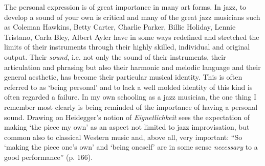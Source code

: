 \documentclass[a4paper]{article}
\begin{document}
The personal expression is of great importance in many art forms. In jazz, to develop a sound of your own is critical and many of the great jazz musicians such as Coleman Hawkins, Betty Carter, Charlie Parker, Billie Holiday, Lennie Tristano, Carla Bley, Albert Ayler have in some ways redefined and stretched the limits of their instruments through their highly skilled, individual and original output. Their \emph{sound}, i.e. not only the sound of their instruments, their articulation and phrasing but also their harmonic and melodic language and their general aesthetic, has become their particular musical identity. This is often referred to as `being personal' and to lack a well molded identity of this kind is often regarded a failure. In my own schooling as a jazz musician, the one thing I remember most clearly is being reminded of the importance of having a personal sound. Drawing on Heidegger's notion of \emph{Eignetlichkeit} \citet{benson03} sees the expectation of making `the piece my own' as an aspect not limited to jazz improvisation, but common also to classical Western music and, above all, very important: ``So `making the piece one's own' and `being oneself' are in some sense \emph{necessary} to a good performance'' (p. 166). 
\end{document}
